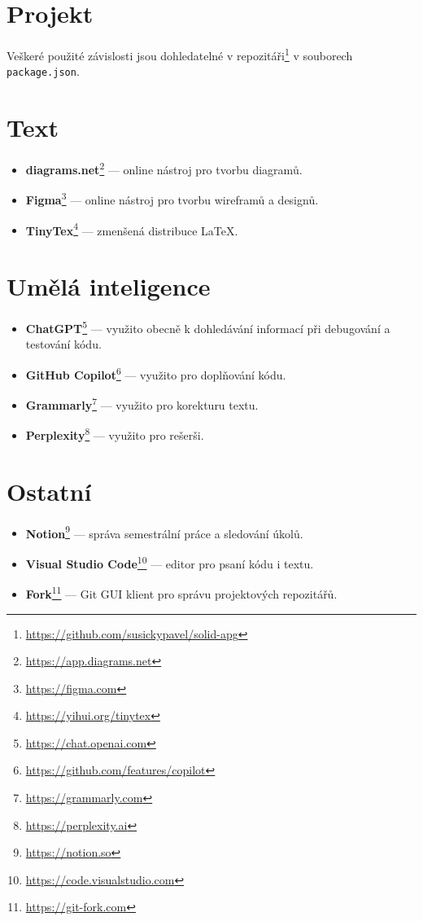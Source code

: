 \clearpage

\section{Projekt}

Veškeré použité závislosti jsou dohledatelné v repozitáři\footnote{\url{https://github.com/susickypavel/solid-apg}} v souborech \\\texttt{package.json}.

\section{Text}

\begin{itemize}
    \item \textbf{diagrams.net}\footnote{\url{https://app.diagrams.net}} --- online nástroj pro tvorbu diagramů.
    \item \textbf{Figma}\footnote{\url{https://figma.com}} --- online nástroj pro tvorbu wireframů a designů.
    \item \textbf{TinyTex}\footnote{\url{https://yihui.org/tinytex}} --- zmenšená distribuce \LaTeX.
\end{itemize}

\section{Umělá inteligence}

\begin{itemize}
    \item \textbf{ChatGPT}\footnote{\url{https://chat.openai.com}} --- využito obecně k dohledávání informací při debugování a testování kódu.
    \item \textbf{GitHub Copilot}\footnote{\url{https://github.com/features/copilot}} --- využito pro doplňování kódu.
    \item \textbf{Grammarly}\footnote{\url{https://grammarly.com}} --- využito pro korekturu textu.
    \item \textbf{Perplexity}\footnote{\url{https://perplexity.ai}} --- využito pro rešerši.
\end{itemize}

\section{Ostatní}

\begin{itemize}
    \item \textbf{Notion}\footnote{\url{https://notion.so}} --- správa semestrální práce a sledování úkolů.
    \item \textbf{Visual Studio Code}\footnote{\url{https://code.visualstudio.com}} --- editor pro psaní kódu i textu.
    \item \textbf{Fork}\footnote{\url{https://git-fork.com}} --- Git GUI klient pro správu projektových repozitářů.
\end{itemize}
